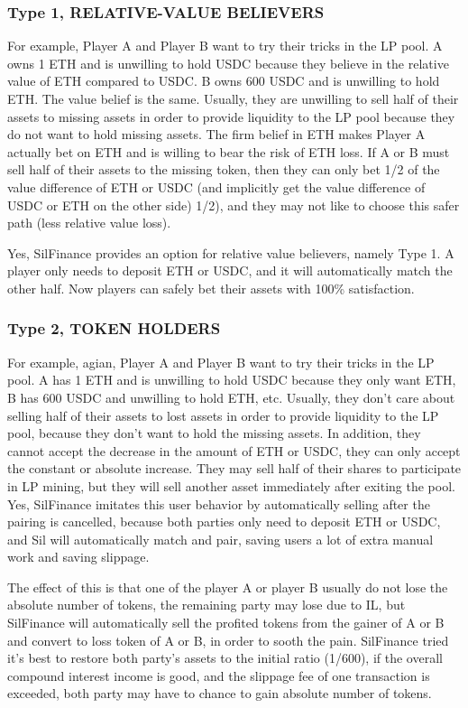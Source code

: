 \documentclass[11pt,letterpaper]{article}
\begin{document}
\begin{multicols}{2}
\subsubsection{Type 1, RELATIVE-VALUE BELIEVERS}
For example, Player A and Player B want to try their tricks in the LP pool. A owns 1 ETH and is unwilling to hold USDC because they believe in the relative value of ETH compared to USDC. B owns 600 USDC and is unwilling to hold ETH. The value belief is the same. Usually, they are unwilling to sell half of their assets to missing assets in order to provide liquidity to the LP pool because they do not want to hold missing assets. The firm belief in ETH makes Player A actually bet on ETH and is willing to bear the risk of ETH loss. If A or B must sell half of their assets to the missing token, then they can only bet 1/2 of the value difference of ETH or USDC (and implicitly get the value difference of USDC or ETH on the other side) 1/2), and they may not like to choose this safer path (less relative value loss).

Yes, SilFinance provides an option for relative value believers, namely Type 1. A player only needs to deposit ETH or USDC, and it will automatically match the other half. Now players can safely bet their assets with 100\% satisfaction.

\subsubsection{Type 2, TOKEN HOLDERS}
For example, agian, Player A and Player B want to try their tricks in the LP pool. A has 1 ETH and is unwilling to hold USDC because they only want ETH, B has 600
USDC and unwilling to hold ETH, etc. Usually, they don't care about selling half of their assets to lost assets in order to provide liquidity to the LP pool, because they don't want to hold the missing assets. In addition, they cannot accept the decrease in the amount of ETH or USDC, they can only accept the constant or absolute increase. They may sell half of their shares to participate in LP mining, but they will sell another asset immediately after exiting the pool. Yes, SilFinance imitates this user behavior by automatically selling after the pairing is cancelled, because both parties only need to deposit ETH or USDC, and Sil will automatically match and pair, saving users a lot of extra manual work and saving slippage.

The effect of this is that one of the player A or player B usually do not lose the absolute number of tokens, the remaining party may lose due to IL, but SilFinance will automatically sell the profited tokens from the gainer of A or B and convert to loss token of A or B, in order to sooth the pain. SilFinance tried it's best to restore both party's assets to the initial ratio (1/600), if the overall compound interest income is good, and the slippage fee of one transaction is exceeded, both party may have to chance to gain absolute number of tokens.

\end{multicols}
\end{document}

